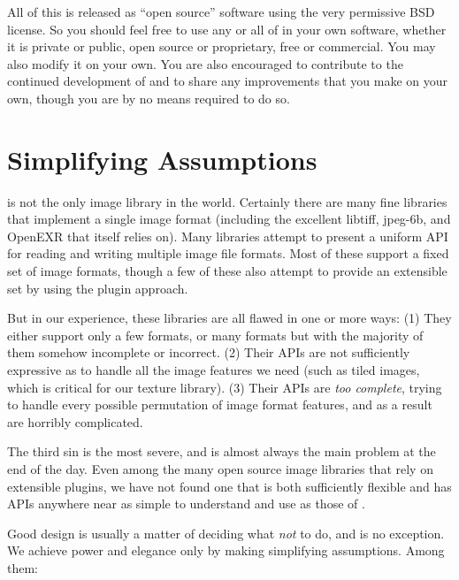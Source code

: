 All of this is released as ``open source'' software using the very
permissive BSD license.  So you should feel free to use any or all of
\product in your own software, whether it is private or public, open
source or proprietary, free or commercial.  You may also modify it on
your own.  You are also encouraged to contribute to the continued
development of \product and to share any improvements that you make on
your own, though you are by no means required to do so.

\section{Simplifying Assumptions}

\product is not the only image library in the world.  Certainly there
are many fine libraries that implement a single image format (including
the excellent {\fn libtiff}, {\fn jpeg-6b}, and {\fn OpenEXR} that
\product itself relies on).  Many libraries attempt to present a uniform
API for reading and writing multiple image file formats.  Most of these
support a fixed set of image formats, though a few of these
also attempt to provide an extensible set by using the plugin approach.

But in our experience, these libraries are all flawed in one or more
ways: (1) They either support only a few formats, or many formats but
with the majority of them somehow incomplete or incorrect.  (2) Their
APIs are not sufficiently expressive as to handle all the image features
we need (such as tiled images, which is critical for our texture
library).  (3) Their APIs are \emph{too complete}, trying to handle
every possible permutation of image format features, and as a result
are horribly complicated.

The third sin is the most severe, and is almost always the main problem
at the end of the day.  Even among the many open source image libraries
that rely on extensible plugins, we have not found one that is both
sufficiently flexible and has APIs anywhere near as simple to understand
and use as those of \product.

Good design is usually a matter of deciding what \emph{not} to do, and
\product is no exception.  We achieve power and elegance only by
making simplifying assumptions.  Among them:

